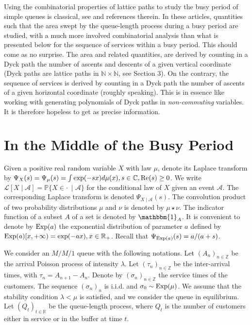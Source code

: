 \documentclass[11pt,a4paper]{article}
\numberwithin{equation}{section}
\newcommand{\mrm}[1]{\text{\rm #1}}
\newcommand{\A}{\mathcal{A}}
\newcommand{\R}{\mathbb{R}}
\newcommand{\1}{\mathbbm{1}}
\newcommand{\C}{\mathbb{C}}
\newcommand{\p}{\mathbb{P}}
\newcommand{\Z}{\mathbb{Z}}
\newcommand{\N}{\mathbb{N}}
\newcommand{\Lom}{\mathcal{L}}
\begin{document}
Using the combinatorial properties of lattice paths to study the busy period of simple queues is classical,
see \cite{Flajolet,Guillemin, taka2} and references therein.
In these articles, quantities such that the area swept by the queue-length process during a busy period are studied, with a much more involved
combinatorial analysis than what is presented below for the sequence of services within a busy period. This should come as no surprise.
The area and related quantities, are derived by counting in a Dyck path the number of ascents and descents of a given vertical coordinate
(Dyck paths are lattice paths in $\N\times \N$, see Section 3). On the contrary, the sequence of services is derived by counting in a Dyck path
the number of ascents of a given horizontal coordinate (roughly speaking). This is in essence like working with generating polynomials of Dyck paths in
{\em non-commuting} variables. It is therefore hopeless to get as precise information.


\section{In the Middle of the Busy Period}
Given a positive real random variable $X$ with law $\mu$, denote its Laplace transform by
$\Psi_{X}(s) = \Psi_{\mu}(s)= \int \exp (-sx) d\mu(x), s\in \C, \mrm{Re}(s)\geq 0$.
We write $\Lom[X\mid \A]=\p\{X \in \cdot \:\mid \A\}$  for the conditional
law of $X$ given an event $\A$. The corresponding Laplace transform
is denoted $\Psi_{X\mid\A}(s)$. The convolution product of two probability distributions $\mu$ and $\nu$ is denoted by
$\mu \star \nu$. The
indicator function of a subset $A$ of a set is denoted by $\1_{A}$.
It is convenient to denote by $\mrm{Exp}(a)$ the exponential
distribution of parameter $a$ defined by $\mrm{Exp}(a) [x,+\infty) =
\exp (-ax), x\in \R_+$.
Recall that $\Psi_{\mrm{Exp}(a)}(s)= a/(a+s)$.

\medskip

We consider an $M/M/1$ queue with the following notations.
Let $(A_n)_{n\in \Z}$ be the arrival Poisson process of intensity
$\lambda$. Let $(\tau_n)_{n\in \Z}$ be the inter-arrival times, with
$\tau_n =A_{n+1}-A_n$. Denote by $(\sigma_n)_{n\in \Z}$ the service
times of the customers. The sequence $(\sigma_n)_{n}$ is
i.i.d. and $\sigma_0 \sim \mrm{Exp}(\mu)$.
We assume that the stability condition $\lambda < \mu$ is satisfied,
and we consider the queue in equilibrium. Let $(Q_t)_{t\in \R}$ be the
queue-length process, where $Q_t$ is the number of customers either in
service or in the buffer at time $t$.
\end{document}
